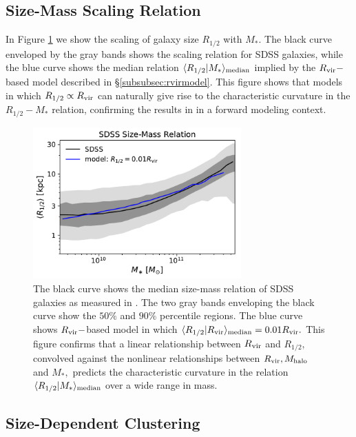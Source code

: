\documentclass[usenatbib,usegraphicx,letterpaper]{mn2e}
\newcommand{\rhalf}{R_{1/2}}
\newcommand{\mstar}{M_{\ast}}
\newcommand{\mhalo}{M_{\rm halo}}
\newcommand{\rvir}{R_{\rm vir}}
\newcommand{\median}[2]{\langle{#1}\vert{#2}\rangle_{\rm median}}
\begin{document}
\subsection{Size-Mass Scaling Relation}
\label{subsec:one_point_function}

In Figure \ref{fig:scatter_plot} we show the scaling of galaxy size $\rhalf$ with $\mstar.$ The black curve enveloped by the gray bands shows the scaling relation for SDSS galaxies, while the blue curve shows the median relation  $\median{\rhalf}{\mstar}$ implied by the $\rvir-$based model described in \S\ref{subsubsec:rvirmodel}. This figure shows that models in which $\rhalf\propto\rvir$ can naturally give rise to the characteristic curvature in the $\rhalf-\mstar$ relation, confirming the results in \citet{kravtsov13} in a forward modeling context.

\begin{figure}
\centering
\includegraphics[width=8cm]{FIGS/rvir_only_rhalf_vs_mstar_sham_model.pdf}
\caption{
The black curve shows the median size-mass relation of SDSS galaxies as measured in \citet{meert_etal15}. The two gray bands enveloping the black curve show the $50\%$ and $90\%$ percentile regions. The blue curve shows $\rvir-$based model in which $\median{\rhalf}{\rvir}=0.01\rvir.$ This figure confirms that a linear relationship between $\rvir$ and $\rhalf,$ convolved against the nonlinear relationships between $\rvir, \mhalo$ and $\mstar,$  predicts the characteristic curvature in the relation $\median{\rhalf}{\mstar}$ over a wide range in mass.
}
\label{fig:scatter_plot}
\end{figure}

\subsection{Size-Dependent Clustering}
\label{subsec:clustering_results}
\end{document}
